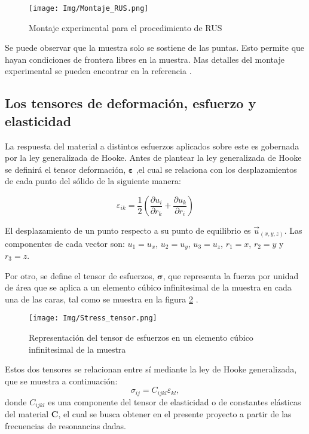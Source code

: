 \documentclass[12pt]{article}
\begin{document}
\begin{figure}[H]
    \centering
    \texttt{[image: Img/Montaje\_RUS.png]}
    \caption{Montaje experimental para el procedimiento de RUS \cite{Leisure_1997}}
    \label{fig:montaje_rus}
\end{figure}

Se puede observar que la muestra solo se sostiene de las puntas. Esto permite que hayan condiciones de frontera libres en la muestra. Mas detalles del montaje experimental se pueden encontrar en la referencia \cite{MIGLIORI19931}.

\subsection{Los tensores de deformación, esfuerzo y elasticidad}

La respuesta del material a distintos esfuerzos aplicados sobre este es gobernada por la ley generalizada de Hooke. Antes de plantear la ley generalizada de Hooke se definirá el tensor deformación, $\bm{\varepsilon}$ ,el cual se relaciona con los desplazamientos de cada punto del sólido de la siguiente manera:

\begin{equation}
    \varepsilon_{ik} = \frac{1}{2} \left(\frac{\partial u_i}{\partial r_k} + \frac{\partial u_k}{\partial r_i} \right)
	\label{eq:deformación}
\end{equation}

El desplazamiento de un punto respecto a su punto de equilibrio es $\vec{u}_{(x,y,z)}$. Las componentes de cada vector son: $u_1 = u_x$, $u_2 = u_y$, $u_3 = u_z$, $r_1 = x$, $r_2 = y$ y $r_3 = z$.

Por otro, se define el tensor de esfuerzos, $\bm{\sigma}$, que representa la fuerza por unidad de área que se aplica a un elemento cúbico infinitesimal de la muestra en cada una de las caras, tal como se muestra en la figura \ref{fig:tensor_esfuerzos} \cite{oliveira2020}.

\begin{figure}[H]
    \centering
    \texttt{[image: Img/Stress\_tensor.png]}
    \caption{Representación del tensor de esfuerzos en un elemento cúbico infinitesimal de la muestra \cite{oliveira2020}}
    \label{fig:tensor_esfuerzos}
\end{figure}

Estos dos tensores se relacionan entre sí mediante la ley de Hooke generalizada, que se muestra a continuación:
\begin{equation}
	\sigma_{ij} = C_{ijkl}\varepsilon_{kl},
\end{equation}
donde $C_{ijkl}$ es una componente del tensor de elasticidad o de constantes elásticas del material $\bm{C}$, el cual se busca obtener en el presente proyecto a partir de las frecuencias de resonancias dadas. 
\end{document}
